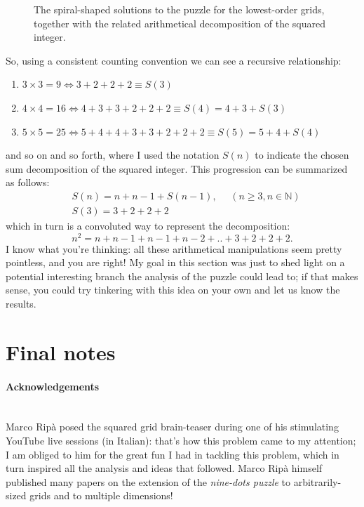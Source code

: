\documentclass[11pt]{article}
\begin{document}
\begin{figure}

\caption{The spiral-shaped solutions to the puzzle for the lowest-order grids, together with the related arithmetical decomposition of the squared integer.}
\label{fig:solution-number-decomposition}
\end{figure}
So, using a consistent counting convention we can see a recursive relationship:\\
\begin{enumerate}
	\item[] %
		$3 \times 3 = 9 \Leftrightarrow 3 + 2 + 2 + 2 \equiv S(3)$
	\item[]
		$4 \times 4 =16 \Leftrightarrow 4 + 3+ 3 + 2 + 2 + 2 \equiv S(4) = 4 + 3 + S(3) $
	\item[]
		$5 \times 5 =25 \Leftrightarrow 5 + 4 + 4 + 3+ 3 + 2 + 2 + 2 \equiv S(5) = 5 + 4 + S(4)$
\end{enumerate}
and so on and so forth, where I used the notation $S(n)$ to indicate the chosen sum decomposition of the squared integer. This progression can be summarized as follows:
\begin{equation}
\begin{aligned}
&S(n) = n + n -1 + S(n - 1), \ \ \ \ \ \  (n \geq 3, n \in \mathbb{N})\\
&S(3) = 3 + 2 + 2 + 2
\end{aligned}
\end{equation}
which in turn is a convoluted way to represent the decomposition:
\begin{equation}
n^2 = n + n - 1 + n - 1 + n - 2 + .. + 3 + 2 + 2 + 2.
\end{equation}
I know what you're thinking: all these arithmetical manipulations seem pretty pointless, and you are right! My goal in this section was just to shed light on a potential interesting branch the analysis of the puzzle could lead to; if that makes sense, you could try tinkering with this idea on your own and let us know the results.

\hypertarget{final-notes}{
	\section{Final notes}
	\label{final-notes}
}

\paragraph{Acknowledgements} \mbox{} \\ %
Marco Ripà posed the squared grid brain-teaser during one of his stimulating YouTube live sessions (in Italian)\cite{marco-ripà-yt}: that's how this problem came to my attention; I am obliged to him for the great fun I had in tackling this problem, which in turn inspired all the analysis and ideas that followed. Marco Ripà himself published many papers on the extension of the \emph{nine-dots puzzle} to arbitrarily-sized grids and to multiple dimensions!\cite{ripà-paper-nxnxn-extension, ripà-paper-nxnxn-extension-02, ripà-paper-nxnxn-extension-03}
\end{document}

